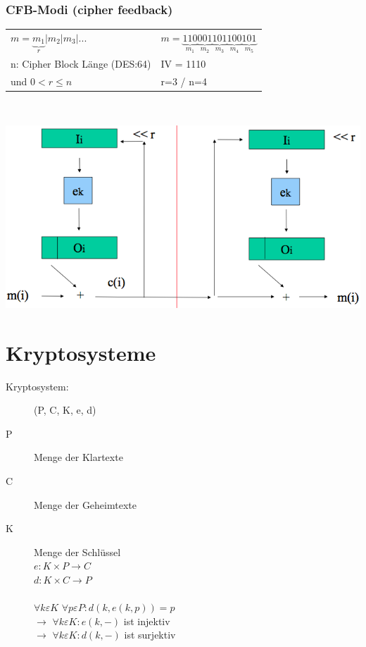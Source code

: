 \documentclass[10pt]{article}
\newcommand{\ra}{\rightarrow}
\begin{document}
\subsubsection{CFB-Modi (cipher feedback)}
\begin{tabular}{p{7.5cm} l}
	$m= \underbrace{m_1}_{r} | m_2 | m_3 | ...$ & $m=\underbrace{110}_{m_1} \underbrace{001}_{m_2} \underbrace{101}_{m_3} \underbrace{100}_{m_4} \underbrace{101}_{m_5}$ \\
	n: Cipher Block Länge (DES:64) & {\color{red} IV = 1110} \\
	{\color{red} und $0 < r \leqslant n$} & {\color{red} r=3} / n=4 \\
\end{tabular} \\
\begin{center}
	\includegraphics[scale=0.25]{cfb-encryption.png}
\end{center}

\newpage
\section{Kryptosysteme}
\begin{description}
	\item[Kryptosystem:] (P, C, K, e, d)
	\item[P] Menge der {\color{blue}Klartexte}
	\item[C] Menge der {\color{red}Geheimtexte}
	\item[K] Menge der Schlüssel \\
		$e:K\times P \ra C$ \\
		$d:K\times C \ra P$ \\ \\
		$\forall k \varepsilon K$ $\forall p \varepsilon P: d( k, e (k,p))=p$ \\
		$\ra$ $\forall k \varepsilon K : e (k,-)$ ist {\color{blue}injektiv} \\
		$\ra$ $\forall k \varepsilon K : d (k,-)$ ist {\color{red}surjektiv} \\
\end{description}
\end{document}
